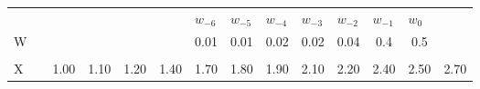 \begin{frame}
\begin{columns}
\begin{overlayarea}{\textwidth}{\textheight}
\begin{minipage}[t]{0.25\textwidth}
{\begin{table}[h]
{\begin{tabular}{p{0.1cm}p{0.1cm}p{0.1cm}p{0.1cm}p{0.1cm}p{0.1cm}p{0.1cm}p{0.1cm}p{0.1cm}p{0.1cm}p{0.1cm}p{0.1cm}p{0.1cm}p{0.1cm}}
								                     &                       &                           &                           &                           &                           & $w_{-6}$                  & $w_{-5}$                                         & $w_{-4}$                                         & $w_{-3}$                                         & $w_{-2}$                                         & $w_{-1}$                                         & $w_{0}$                                          &                                                  \\ \cline{8-13}
								\cline{7-13}
								W                    &                       &                           &                           &                           & \multicolumn{1}{c|}{}     & \multicolumn{1}{c|}{0.01} & \multicolumn{1}{c|}{0.01}                        & \multicolumn{1}{c|}{0.02}                        & \multicolumn{1}{c|}{0.02}                        & \multicolumn{1}{c|}{0.04}                        & \multicolumn{1}{c|}{0.4}                         & \multicolumn{1}{c|}{0.5}                         &                                                  \\ \cline{7-13}
								\multicolumn{1}{l}{} &                       & \multicolumn{1}{l}{}      & \multicolumn{1}{l}{}      & \multicolumn{1}{l}{}      & \multicolumn{1}{l}{}      & \multicolumn{1}{l}{}      & \multicolumn{1}{l}{}                             & \multicolumn{1}{l}{}                             & \multicolumn{1}{l}{}                             & \multicolumn{1}{l}{}                             & \multicolumn{1}{l}{}                             & \multicolumn{1}{l}{}                             &                                                  \\ \cline{3-14} 
								X                    & \multicolumn{1}{l|}{} & \multicolumn{1}{c|}{1.00} & \multicolumn{1}{c|}{1.10} & \multicolumn{1}{c|}{1.20} & \multicolumn{1}{c|}{1.40} & \multicolumn{1}{c|}{1.70} & \multicolumn{1}{c|}{1.80}                        & \multicolumn{1}{c|}{1.90}                        & \multicolumn{1}{c|}{2.10}                        & \multicolumn{1}{c|}{2.20}                        & \multicolumn{1}{c|}{2.40}                        & \multicolumn{1}{c|}{2.50}                        & \multicolumn{1}{c|}{2.70}                        \\ \cline{3-14} 

\end{tabular}}
\end{table}}
\end{minipage}
\end{overlayarea}
\end{columns}
\end{frame}

